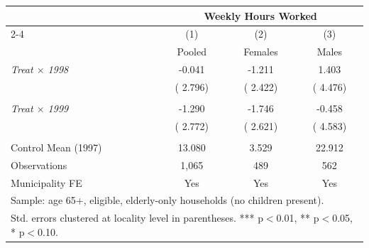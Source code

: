 \begin{tabular}{lccc} \hline \hline
& \multicolumn{3}{c}{Weekly Hours Worked} \\ \cmidrule(lr){2-4}
& \multicolumn{1}{c}{(1)} & \multicolumn{1}{c}{(2)} & \multicolumn{1}{c}{(3)} \\
& \multicolumn{1}{c}{Pooled} & \multicolumn{1}{c}{Females} & \multicolumn{1}{c}{Males} \\ \toprule
\textit{Treat $\times$ 1998} & -0.041 & -1.211 & 1.403 \\
 & (    2.796) & (    2.422) & (    4.476) \\
  & & & \\
\textit{Treat $\times$ 1999} & -1.290 & -1.746 & -0.458 \\
 & (    2.772) & (    2.621) & (    4.583) \\
  & & & \\
Control Mean (1997) &    13.080 &     3.529 &    22.912 \\
Observations &        1,065 &          489 &          562 \\
Municipality FE & Yes & Yes & Yes \\ \bottomrule
\multicolumn{4}{l}{\footnotesize Sample: age 65+, eligible, elderly-only households (no children present).} \\
\multicolumn{4}{l}{\footnotesize Std. errors clustered at locality level in parentheses. *** p$<$0.01, ** p$<$0.05, * p$<$0.10.} \\
\end{tabular}